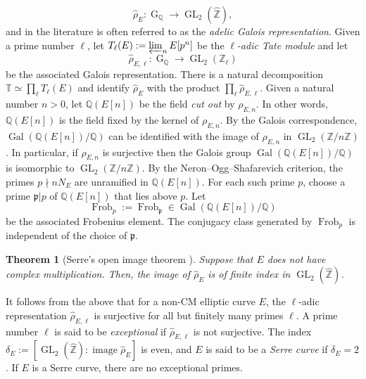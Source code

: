 \documentclass[table]{amsart}
\newtheorem{theorem}{Theorem}[section]
\newcommand{\Z}{\mathbb{Z}}
\newcommand{\Q}{\mathbb{Q}}
\newcommand{\op}[1]{\operatorname{#1}}
\numberwithin{equation}{section}
\begin{document}
\[\widehat{\rho}_E:\op{G}_{\Q}\rightarrow \op{GL}_2(\widehat{\Z}),\]
and in the literature is often referred to as the \emph{adelic Galois representation}. Given a prime number $\ell$, let $T_\ell(E):=\varprojlim_n E[p^n]$ be the \emph{$\ell$-adic Tate module} and let 
\[\widehat{\rho}_{E, \ell}: \op{G}_{\Q}\rightarrow \op{GL}_2(\Z_\ell)\] be the associated Galois representation. There is a natural decomposition $\mathbb{T}\simeq \prod_\ell T_\ell(E)$ and identify $\widehat{\rho}_E$ with the product $\prod_\ell \widehat{\rho}_{E, \ell}$. Given a natural number $n>0$, let $\Q(E[n])$ be the field \emph{cut out} by $\rho_{E, n}$. In other words, $\Q(E[n])$ is the field fixed by the kernel of $\rho_{E,n}$. By the Galois correspondence, $\op{Gal}(\Q(E[n])/\Q)$ can be identified with the image of $\rho_{E,n}$ in $\op{GL}_2(\Z/n\Z)$. In particular, if $\rho_{E,n}$ is surjective then the Galois group $\op{Gal}(\Q(E[n])/\Q)$ is isomorphic to $\op{GL}_2(\Z/n\Z)$. By the Neron--Ogg--Shafarevich criterion, the primes $p\nmid nN_E$ are unramified in $\Q(E[n])$. For each such prime $p$, choose a prime $\mathfrak{p}|p$ of $\Q(E[n])$ that lies above $p$. Let \[\op{Frob}_p:=\op{Frob}_{\mathfrak{p}}\in \op{Gal}(\Q(E[n])/\Q)\] be the associated Frobenius element. The conjugacy class generated by $\op{Frob}_p$ is independent of the choice of $\mathfrak{p}$.

\begin{theorem}[Serre's open image theorem \cite{serre1, serre2}]
    Suppose that $E$ does not have complex multiplication. Then, the image of $\widehat{\rho}_E$ is of finite index in $\op{GL}_2(\widehat{\Z})$. 
\end{theorem}
\noindent It follows from the above that for a non-CM elliptic curve $E$, the $\ell$-adic representation $\widehat{\rho}_{E, \ell}$ is surjective for all but finitely many primes $\ell$. A prime number $\ell$ is said to be \emph{exceptional} if $\widehat{\rho}_{E, \ell}$ is not surjective. The index $\delta_E:=[\op{GL}_2(\widehat{\Z}):\op{image} \widehat{\rho}_E]$ is even, and $E$ is said to be a \emph{Serre curve} if $\delta_E=2$. If $E$ is a Serre curve, there are no exceptional primes. 
\end{document}
